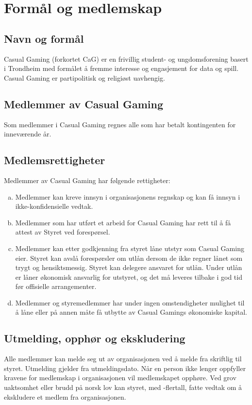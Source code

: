 \chapter{Formål og medlemskap}

\emptychapterspacing

\section{Navn og formål}
Casual Gaming (forkortet CaG) er en frivillig student- og ungdomsforening basert i Trondheim med formålet å fremme interesse og engasjement for data og spill. Casual Gaming er partipolitisk og religiøst uavhengig.

\section{Medlemmer av Casual Gaming}
Som medlemmer i Casual Gaming regnes alle som har betalt kontingenten for inneværende år.

\section{Medlemsrettigheter}
Medlemmer av Casual Gaming har følgende rettigheter:
\begin{enumerate}[a.]
    \item Medlemmer kan kreve innsyn i organisasjonens regnskap og kan få innsyn i ikke-konfiden\-sielle vedtak.
    \item Medlemmer som har utført et arbeid for Casual Gaming har rett til å få attest av Styret ved forespørsel.
    \item Medlemmer kan etter godkjenning fra styret låne utstyr som Casual Gaming eier. Styret kan avslå forespørsler om utlån dersom de ikke regner lånet som trygt og hensiktsmessig. Styret kan delegere ansvaret for utlån. Under utlån er låner økonomisk ansvarlig for utstyret, og det må leveres tilbake i god tid før offisielle arrangementer.
    \item Medlemmer og styremedlemmer har under ingen omstendigheter mulighet til å låne eller på annen måte få utbytte av Casual Gamings økonomiske kapital.
\end{enumerate}

\section{Utmelding, opphør og ekskludering}
Alle medlemmer kan melde seg ut av organisasjonen ved å melde fra skriftlig til styret. Utmelding gjelder fra utmeldingsdato. Når en person ikke lenger oppfyller kravene for medlemskap i organisasjonen vil medlemskapet opphøre. Ved grov uaktsomhet eller brudd på norsk lov kan styret, med -flertall, fatte vedtak om å ekskludere et medlem fra organisasjonen.
